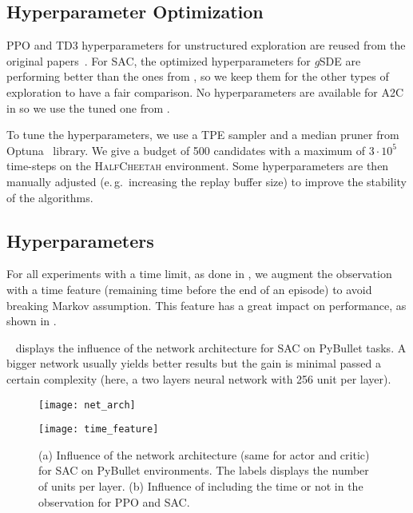 \documentclass{article}
\newcommand{\eg}{e.\,g.\ }
\newcommand{\ourSDE}{\textit{g}\textsc{SDE}\xspace}
\newcommand{\aac}{\textsc{A2C}\xspace}
\newcommand{\ppo}{\textsc{PPO}\xspace}
\newcommand{\sac}{\textsc{SAC}\xspace}
\newcommand{\tddd}{\textsc{TD3}\xspace}
\newcommand{\hc}{\textsc{HalfCheetah}\xspace}
\begin{document}
\subsection{Hyperparameter Optimization}
\label{sec:optim}

\ppo and \tddd hyperparameters for unstructured exploration are reused from the original papers~\citep{schulman2017proximal, fujimoto2018addressing}.
For \sac, the optimized hyperparameters for \ourSDE are performing better than the ones from \citet{haarnoja2018soft}, so we keep them for the other types of exploration to have a fair comparison.
No hyperparameters are available for \aac in \citet{mnih2016asynchronous} so we use the tuned one from \citet{raffin2018zoo}.

To tune the hyperparameters, we use a TPE sampler and a median pruner from Optuna~\citep{akiba2019optuna} library.
We give a budget of 500 candidates with a maximum of $3 \cdot 10^{5}$ time-steps on the \hc environment. Some hyperparameters are then manually adjusted (\eg increasing the replay buffer size) to improve the stability of the algorithms.


\subsection{Hyperparameters}
\label{sec:hyperparameters}

For all experiments with a time limit, as done in \citep{duan2016benchmarking, pardo2017time, rajeswaran2017towards, hill2018stable}, we augment the observation with a time feature (remaining time before the end of an episode) to avoid breaking Markov assumption. This feature has a great impact on performance, as shown in .

~ displays the influence of the network architecture for \sac on PyBullet tasks. A bigger network usually yields better results but the gain is minimal passed a certain complexity (here, a two layers neural network with 256 unit per layer).

\begin{figure}[h]
  \begin{minipage}[t]{.5\linewidth}
    \centering\texttt{[image: net\_arch]}
    \label{fig:net-arch}
  \end{minipage}
  \begin{minipage}[t]{.5\linewidth}
    \centering\texttt{[image: time\_feature]}
    \label{fig:time-wrapper}
  \end{minipage}
  \caption{(a) Influence of the network architecture (same for actor and critic) for \sac on PyBullet environments. The labels displays the number of units per layer. (b) Influence of including the time or not in the observation for \ppo and \sac.}
\end{figure}
\end{document}
